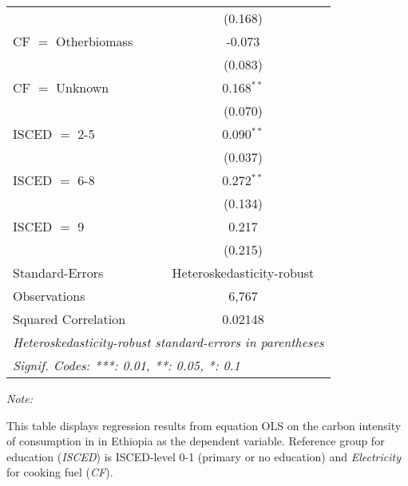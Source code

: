 \begin{table}[htbp!]
\begin{adjustbox}{width = 1\textwidth, max height = 0.95\textheight, center}
\begin{threeparttable}[b]
\begin{tabular}{lc}
                                & (0.168)\\   
            CF $=$ Otherbiomass & -0.073\\   
                                & (0.083)\\   
            CF $=$ Unknown      & 0.168$^{**}$\\   
                                & (0.070)\\   
            ISCED $=$ 2-5       & 0.090$^{**}$\\   
                                & (0.037)\\   
            ISCED $=$ 6-8       & 0.272$^{**}$\\   
                                & (0.134)\\   
            ISCED $=$ 9         & 0.217\\   
                                & (0.215)\\   
            \midrule 
            Standard-Errors     & Heteroskedasticity-robust \\   
            Observations        & 6,767\\  
            Squared Correlation & 0.02148\\  
            \midrule \midrule
            \multicolumn{2}{l}{\emph{Heteroskedasticity-robust standard-errors in parentheses}}\\
            \multicolumn{2}{l}{\emph{Signif. Codes: ***: 0.01, **: 0.05, *: 0.1}}\\
         \end{tabular}
         
         \begin{tablenotes}\item \medskip \textit{Note:}
            \item This table displays regression results from equation OLS on the carbon intensity of consumption in  in Ethiopia as the dependent variable. Reference group for education (\textit{ISCED}) is ISCED-level 0-1 (primary or no education) and \textit{Electricity} for cooking fuel (\textit{CF}).
         \end{tablenotes}
      \end{threeparttable}
   \end{adjustbox}
\end{table}


